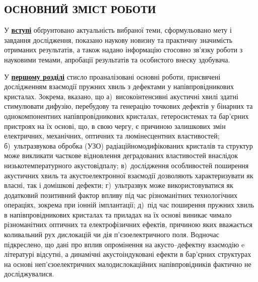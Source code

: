 

\begin{center}
\section*{\MakeUppercase{ОСНОВНИЙ ЗМІСТ РОБОТИ}}
\end{center}

У  \underline{\textbf{вступі}}  обґрунтовано актуальність  вибраної  теми, сформульовано  мету  і
завдання  дослідження, показано  наукову  новизну  та практичну  значимість
отриманих результатів, а також надано інформацію стосовно зв’язку роботи з науковими темами, апробації результатів та
особистого внеску здобувача.


У  \underline{\textbf{першому розділі}}   стисло проаналізовані основні роботи, присвячені
дослідженням взаємодії пружних хвиль з дефектами у напівпровідникових кристалах.
Зокрема,
вказано, що
а)~високоінтенсивні акустичні хвилі здатні стимулювати дифузію, перебудову та генерацію точкових дефектів у бінарних та однокомпонентних напівпровідникових кристалах, гетеросистемах та бар'єрних пристроях на їх основі,
що, в свою чергу, є причиною залишкових змін електричних, механічних, оптичних та  люмінесцентних властивостей;
б)~ультразвукова обробка (УЗО) радіаційномодифікованих кристалів та структур може викликати часткове відновлення деградованих властивостей внаслідок низькотемпературного акустовідпалу;
в)~дослідження особливостей поширення акустичних хвиль та акустоелектронної взаємодії дозволяють характеризувати як власні, так і домішкові дефекти;
г)~ультразвук може використовуватися як додатковий позитивний фактор впливу під час різноманітних технологічних  операціях, зокрема при іонній імплантації;
д)~під час поширення пружних хвиль в напівпровідникових кристалах та приладах на їх основі виникає чимало різноманітних оптичних та електрофізичних ефектів, причиною яких вважається коливальний рух дислокацій чи дія п'єзоелектричного поля.
Водночас підкреслено,
що дані про вплив опромінення на акусто--дефектну взаємодію e літературі відсутні,
а динамічні акустоіндуковані ефекти в бар'єрних структурах на основі неп'єзоелектричних малодислокаційних напівпровідників фактично не досліджувалися.

